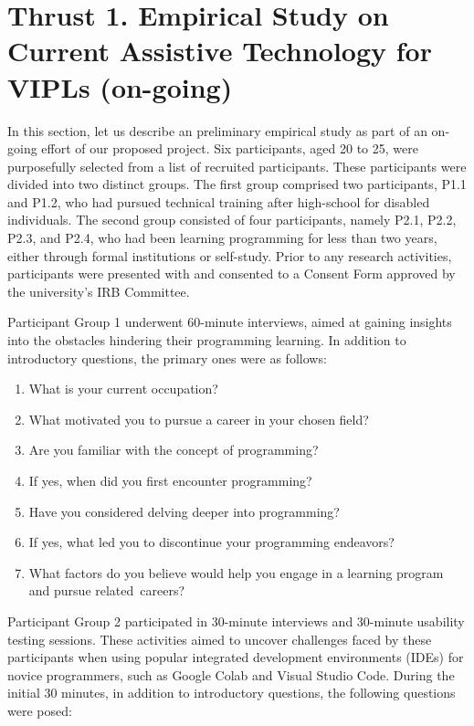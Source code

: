\section{Thrust 1. Empirical Study on Current Assistive Technology for VIPLs (on-going)}
\label{sec:thrust1}

In this section, let us describe an preliminary empirical study as
part of an on-going effort of our proposed project. Six participants,
aged 20 to 25, were purposefully selected from a list of recruited
participants. These participants were divided into two distinct
groups. The first group comprised two participants, P1.1 and P1.2, who
had pursued technical training after high-school for disabled
individuals. The second group consisted of four participants, namely
P2.1, P2.2, P2.3, and P2.4, who had been learning programming for less
than two years, either through formal institutions or
self-study. Prior to any research activities, participants were
presented with and consented to a Consent Form approved by the
university's IRB Committee.

Participant Group 1 underwent 60-minute interviews, aimed at gaining
insights into the obstacles hindering their programming learning. In
addition to introductory questions, the primary ones were as
follows:

\begin{enumerate}

\item What is your current occupation?
  
\item What motivated you to pursue a career in your chosen field?

\item Are you familiar with the concept of programming?

\item If yes, when did you first encounter programming?
  
\item Have you considered delving deeper into programming?

\item If yes, what led you to discontinue your programming endeavors?

\item What factors do you believe would help you engage in a learning program and pursue related~careers?

\end{enumerate}
  
Participant Group 2 participated in 30-minute interviews and 30-minute
usability testing sessions. These activities aimed to uncover
challenges faced by these participants when using popular integrated
development environments (IDEs) for novice programmers, such as Google
Colab and Visual Studio Code. During the initial 30 minutes, in
addition to introductory questions, the following questions were posed:


